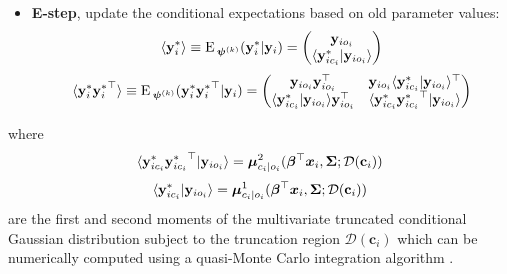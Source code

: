 \documentclass{interact}
\theoremstyle{plain}
\theoremstyle{definition}
\theoremstyle{remark}
\begin{document}
\begin{itemize}
    \item  \textbf{E-step}, update the conditional expectations based on old parameter values:
\begin{align}
    \langle {\mathbf{y}_i^*} \rangle\equiv {\rm E}\,_{\bm{\psi}^{(k)}}(\mathbf{y}_i^*|\mathbf{y}_i)=
    \begin{pmatrix}
                \mathbf{y}_{io_{i}}\\
                \langle \mathbf{y}_{ic_{i}}^*|\mathbf{y}_{io_{i}} \rangle
    \end{pmatrix}
\end{align}
\begin{align}
    \langle {\mathbf{y}_i^*{\mathbf{y}_i^*}^\top} \rangle\equiv {\rm E}\,_{\bm{\psi}^{(k)}}(\mathbf{y}_i^*{\mathbf{y}_i^*}^\top|\mathbf{y}_i)=
    \begin{pmatrix}
                \mathbf{y}_{io_{i}}\mathbf{y}_{io_{i}}^\top & \mathbf{y}_{io_{i}}\langle\mathbf{y}_{ic_{i}}^*|\mathbf{y}_{io_{i}}\rangle^\top\\
                \langle\mathbf{y}_{ic_{i}}^*|\mathbf{y}_{io_{i}}\rangle \mathbf{y}_{io_{i}}^\top & \langle \mathbf{y}_{ic_{i}}^* {\mathbf{y}_{ic_{i}}^*}^\top|\mathbf{y}_{io_{i}} \rangle
    \end{pmatrix}
\end{align}
\end{itemize}
where
\begin{align*}
    \langle \mathbf{y}_{ic_{i}}^* {\mathbf{y}_{ic_{i}}^*}^\top|\mathbf{y}_{io_{i}}\rangle
    =\boldsymbol{\mu}_{c_i|o_i}^2({{\bm \beta}^\top\bm{x}_i},\bm{\Sigma}; \mathcal{D}(\textbf{c}_i))
\end{align*}
\begin{align*}
    \langle \mathbf{y}_{ic_{i}}^*|\mathbf{y}_{io_{i}}\rangle
    =\boldsymbol{\mu}_{c_i|o_i}^1({{\bm \beta}^\top\bm{x}_i},\bm{\Sigma}; \mathcal{D}(\textbf{c}_i))
\end{align*}
are the first and second moments of the multivariate truncated conditional Gaussian distribution subject to the truncation region $\mathcal{D}(\textbf{c}_i)$ which can be numerically computed using a quasi-Monte Carlo integration algorithm \citep{Genz2002,Genz2004}. 
\end{document}
